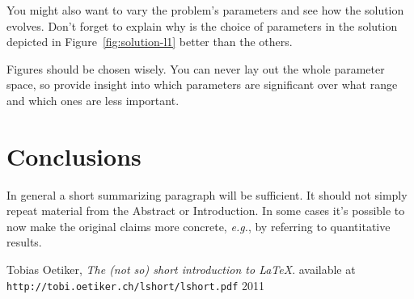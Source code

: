 \documentclass[a4paper]{IEEEtran}
\begin{document}
You might also want to vary the problem's parameters and see how the
solution evolves. Don't forget to explain why is the choice of
parameters in the solution depicted in Figure~\ref{fig:solution-l1}
better than the others.

Figures should be chosen wisely. You can never lay out the whole
parameter space, so provide insight into which parameters are
significant over what range and which ones are less important.



\section{Conclusions}
\label{sec:conclusion}

In general a short summarizing paragraph will be sufficient. It should
not simply repeat material from the Abstract or Introduction. In some
cases it's possible to now make the original claims more concrete,
\textit{e.g.}, by referring to quantitative results.


\begin{thebibliography}{9}

  Tobias Oetiker,
  \emph{The (not so) short introduction to \LaTeX}.
  available at \texttt{http://tobi.oetiker.ch/lshort/lshort.pdf}
  2011

\end{thebibliography}
\end{document}
